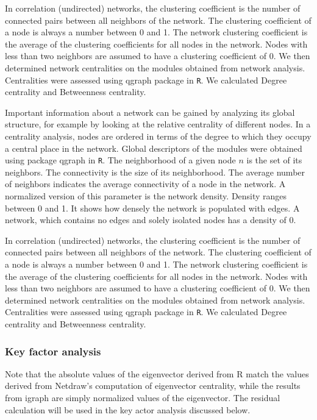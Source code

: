 \documentclass[a4paper]{article}
\begin{document}
In correlation (undirected) networks, the clustering coefficient is the number of connected pairs between all neighbors of the network. The clustering coefficient of a node is always a number between 0 and 1. The network clustering coefficient is the average of the clustering coefficients for all nodes in the network. Nodes with less than two neighbors are assumed to have a clustering coefficient of 0. We then determined network centralities on the modules obtained from network analysis. Centralities were assessed using qgraph package in \texttt{R}. We calculated Degree centrality and Betweenness centrality.
 
Important information about a network can be gained by analyzing its global structure, for example by looking at the relative centrality of different nodes. In a centrality analysis, nodes are ordered in terms of the degree to which they occupy a central place in the network. Global descriptors of the modules were obtained using package qgraph in \texttt{R}. The neighborhood of a given node $n$ is the set of its neighbors. The connectivity is the size of its neighborhood. The average number of neighbors indicates the average connectivity of a node in the network. A normalized version of this parameter is the network density. Density ranges between 0 and 1. It shows how densely the network is populated with edges. A network, which contains no edges and solely isolated nodes has a density of 0. 

In correlation (undirected) networks, the clustering coefficient is the number of connected pairs between all neighbors of the network. The clustering coefficient of a node is always a number between 0 and 1. The network clustering coefficient is the average of the clustering coefficients for all nodes in the network. Nodes with less than two neighbors are assumed to have a clustering coefficient of 0. We then determined network centralities on the modules obtained from network analysis. Centralities were assessed using qgraph package in \texttt{R}. We calculated Degree centrality and Betweenness centrality.

\subsubsection*{Key factor analysis}

Note that the absolute values of the eigenvector derived from R match the values derived from Netdraw’s computation of eigenvector centrality, while the results from igraph are simply normalized values of the eigenvector.  The residual calculation will be used in the key actor analysis discussed below. 
\end{document}
